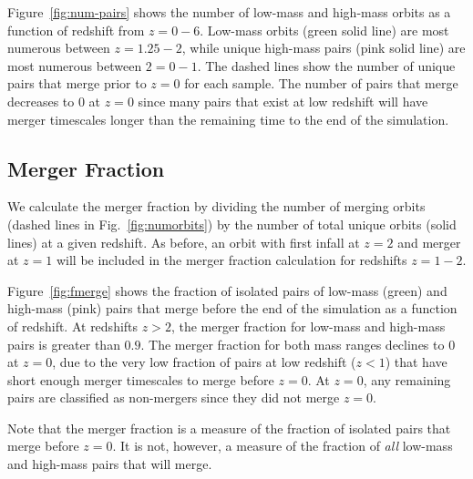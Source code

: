 \documentclass[twocolumn,linenumbers]{aastex631}
\begin{document}
Figure~\ref{fig:num-pairs} shows the number of low-mass and high-mass orbits as a function of redshift from $z=0-6$. 
Low-mass orbits (green solid line) are most numerous between $z=1.25-2$, while unique high-mass pairs (pink solid line) are most numerous between $2=0-1$.
The dashed lines show the number of unique pairs that merge prior to $z=0$ for each sample. 
The number of pairs that merge decreases to 0 at $z=0$ since 
many pairs that exist at low redshift will have merger timescales longer than the remaining time to the end of the simulation. 


\subsection{Merger Fraction}
We calculate the merger fraction by dividing the number of merging orbits (dashed lines in Fig.~\ref{fig:numorbits}) by the number of total unique orbits (solid lines) at a given redshift. 
As before, an orbit with first infall at $z=2$ and merger at $z=1$ will be included in the merger fraction calculation for redshifts $z=1-2$.

Figure~\ref{fig:fmerge} shows the fraction of isolated pairs of low-mass (green) and high-mass (pink) pairs that merge before the end of the simulation as a function of redshift. 
At redshifts $z>2$, the merger fraction for low-mass and high-mass pairs is greater than $0.9$.
The merger fraction for both mass ranges declines to $0$ at $z=0$, due to the very low fraction of pairs at low redshift ($z<1$) that have short enough merger timescales to merge before $z=0$. At $z=0$, any remaining pairs are classified as non-mergers since they did not merge \textit{$z=0$}.

Note that the merger fraction is a measure of the fraction of isolated pairs that merge before $z=0$. 
It is not, however, a measure of the fraction of \textit{all} low-mass and high-mass pairs that will merge. 
\end{document}
